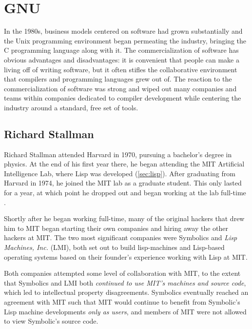 \section{GNU}
\label{sec:gnu}

In the 1980s, business models centered on software had grown substantially
and the Unix programming environment began permeating the industry,
bringing the C programming language along with it.
The commercialization of software has obvious advantages and disadvantages:
it is convenient that people can make a living off of writing software,
but it often stifles the collaborative environment that compilers
and programming languages grew out of.
The reaction to the commercialization of software was strong and
wiped out many companies and teams within companies dedicated to
compiler development while centering the industry around a standard,
free set of tools.

\subsection{Richard Stallman}

Richard Stallman attended Harvard in 1970, pursuing a bachelor's degree in physics.
At the end of his first year there, he began attending the MIT Artificial Intelligence Lab,
where Lisp was developed (\cref{sec:lisp}).
After graduating from Harvard in 1974, he joined the MIT lab as a graduate student.
This only lasted for a year, at which point he dropped out and began
working at the lab full-time \parencite{gross_stallman_interview_1999}.

Shortly after he began working full-time, many of the original hackers that
drew him to MIT began starting their own companies
and hiring away the other hackers at MIT.
The two most significant companies were Symbolics and \textit{Lisp Machines, Inc.} (LMI),
both set out to build \gls{lisp-machine}s and Lisp-based operating systems
based on their founder's experience working with Lisp at MIT.

Both companies attempted some level of collaboration with MIT,
to the extent that Symbolics and LMI both \textit{continued to use MIT's machines
	and source code}, which led to intellectual property disagreements.
Symbolics eventually reached an agreement with MIT such that MIT would continue
to benefit from Symbolic's Lisp machine developments \textit{only as users},
and members of MIT were not allowed to view Symbolic's source code.

